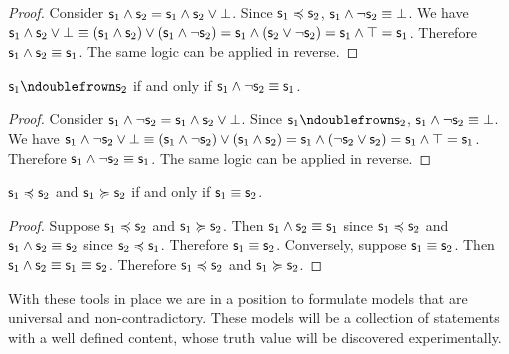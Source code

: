 \documentclass[11pt,letterpaper,fleqn]{memoir} %
\begin{document}
\begin{mathSection}
	\begin{proof}
		Consider $\mathsf{s}_1 \wedge \mathsf{s}_2 = \mathsf{s}_1 \wedge \mathsf{s}_2 \vee \bot$. Since $\mathsf{s}_1 \preccurlyeq \mathsf{s}_2$, $\mathsf{s}_1 \wedge \neg \mathsf{s}_2 \equiv \bot$. We have $\mathsf{s}_1 \wedge \mathsf{s}_2 \vee \bot \equiv ( \mathsf{s}_1 \wedge \mathsf{s}_2 ) \vee (\mathsf{s}_1 \wedge \neg \mathsf{s}_2) = \mathsf{s}_1 \wedge (\mathsf{s}_2 \vee \neg \mathsf{s}_2) = \mathsf{s}_1 \wedge \top = \mathsf{s}_1$. Therefore $\mathsf{s}_1 \wedge \mathsf{s}_2 \equiv \mathsf{s}_1$. The same logic can be applied in reverse.
	\end{proof}	
	
	\begin{prop}
		$\stmt_1 \ncomp \stmt_2$ if and only if $\mathsf{s}_1 \wedge \neg \mathsf{s}_2 \equiv \mathsf{s}_1$.
	\end{prop}
	
	\begin{proof}
		Consider $\mathsf{s}_1 \wedge \neg \mathsf{s}_2 = \mathsf{s}_1 \wedge \mathsf{s}_2 \vee \bot$. Since $\stmt_1 \ncomp \stmt_2$, $\mathsf{s}_1 \wedge \neg \mathsf{s}_2 \equiv \bot$. We have $\mathsf{s}_1 \wedge \neg \mathsf{s}_2 \vee \bot \equiv ( \mathsf{s}_1 \wedge \neg \mathsf{s}_2 ) \vee (\mathsf{s}_1 \wedge \mathsf{s}_2) = \mathsf{s}_1 \wedge (\neg \mathsf{s}_2 \vee \mathsf{s}_2) = \mathsf{s}_1 \wedge \top = \mathsf{s}_1$. Therefore $\mathsf{s}_1 \wedge \neg \mathsf{s}_2 \equiv \mathsf{s}_1$. The same logic can be applied in reverse.
	\end{proof}	
	
	\begin{prop}
		$\mathsf{s}_1 \preccurlyeq \mathsf{s}_2$ and $\mathsf{s}_1 \succcurlyeq \mathsf{s}_2$ if and only if $\mathsf{s}_1 \equiv \mathsf{s}_2$.
	\end{prop}
	
	\begin{proof}
		Suppose $\mathsf{s}_1 \preccurlyeq \mathsf{s}_2$ and $\mathsf{s}_1 \succcurlyeq \mathsf{s}_2$. Then $\mathsf{s}_1 \wedge \mathsf{s}_2 \equiv \mathsf{s}_1$ since $\mathsf{s}_1 \preccurlyeq \mathsf{s}_2$ and $\mathsf{s}_1 \wedge \mathsf{s}_2 \equiv \mathsf{s}_2$ since $\mathsf{s}_2 \preccurlyeq \mathsf{s}_1$. Therefore $\mathsf{s}_1 \equiv \mathsf{s}_2$. Conversely, suppose $\mathsf{s}_1 \equiv \mathsf{s}_2$. Then $\mathsf{s}_1 \wedge \mathsf{s}_2 \equiv \mathsf{s}_1 \equiv \mathsf{s}_2$. Therefore $\mathsf{s}_1 \preccurlyeq \mathsf{s}_2$ and $\mathsf{s}_1 \succcurlyeq \mathsf{s}_2$.
	\end{proof}	
\end{mathSection}

With these tools in place we are in a position to formulate models that are universal and non-contradictory. These models will be a collection of statements with a well defined content, whose truth value will be discovered experimentally.
\end{document}
